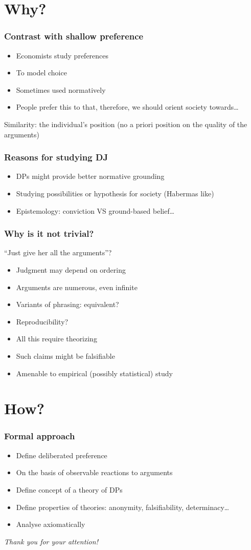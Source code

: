 \documentclass[french, english]{beamer}
\begin{document}
\section{Why?}
\begin{frame}
	\frametitle{Contrast with shallow preference}
	\begin{itemize}
		\item Economists study preferences
		\item To model choice
		\item Sometimes used normatively
		\item People prefer this to that, therefore, we should orient society towards…
	\end{itemize}
  Similarity: the individual’s position (no a priori position on the quality of the arguments)
\end{frame}

\begin{frame}
	\frametitle{Reasons for studying DJ}
	\begin{itemize}
		\item DPs might provide better normative grounding
		\item Studying possibilities or hypothesis for society (Habermas like)
		\item Epistemology: conviction VS ground-based belief…
	\end{itemize}
\end{frame}

\begin{frame}
	\frametitle{Why is it not trivial?}
  “Just give her all the arguments”?
	\begin{itemize}
		\item Judgment may depend on ordering
		\item Arguments are numerous, even infinite
		\item Variants of phrasing: equivalent?
		\item Reproducibility?
		\item All this require theorizing
		\item Such claims might be falsifiable
		\item Amenable to empirical (possibly statistical) study
	\end{itemize}
\end{frame}

\section{How?}
\begin{frame}
	\frametitle{Formal approach}
	\begin{itemize}
		\item Define deliberated preference
		\item On the basis of observable reactions to arguments
		\item Define concept of a theory of DPs
		\item Define properties of theories: anonymity, falsifiability, determinacy…
		\item Analyse axiomatically
	\end{itemize}
\end{frame}

\begin{frame}[plain]
	\addtocounter{framenumber}{-1}
	\begin{center}
		\huge
		\textit{Thank you for your attention!}
	\end{center}
\end{frame}
\end{document}
